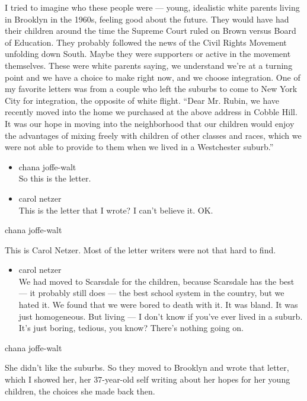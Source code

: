I tried to imagine who these people were --- young, idealistic white
parents living in Brooklyn in the 1960s, feeling good about the future.
They would have had their children around the time the Supreme Court
ruled on Brown versus Board of Education. They probably followed the
news of the Civil Rights Movement unfolding down South. Maybe they were
supporters or active in the movement themselves. These were white
parents saying, we understand we're at a turning point and we have a
choice to make right now, and we choose integration. One of my favorite
letters was from a couple who left the suburbs to come to New York City
for integration, the opposite of white flight. ``Dear Mr. Rubin, we have
recently moved into the home we purchased at the above address in Cobble
Hill. It was our hope in moving into the neighborhood that our children
would enjoy the advantages of mixing freely with children of other
classes and races, which we were not able to provide to them when we
lived in a Westchester suburb.''

\begin{itemize}
\item
  chana joffe-walt\\
  So this is the letter.
\item
  carol netzer\\
  This is the letter that I wrote? I can't believe it. OK.
\end{itemize}

chana joffe-walt

This is Carol Netzer. Most of the letter writers were not that hard to
find.

\begin{itemize}
\tightlist
\item
  carol netzer\\
  We had moved to Scarsdale for the children, because Scarsdale has the
  best --- it probably still does --- the best school system in the
  country, but we hated it. We found that we were bored to death with
  it. It was bland. It was just homogeneous. But living --- I don't know
  if you've ever lived in a suburb. It's just boring, tedious, you know?
  There's nothing going on.
\end{itemize}

chana joffe-walt

She didn't like the suburbs. So they moved to Brooklyn and wrote that
letter, which I showed her, her 37-year-old self writing about her hopes
for her young children, the choices she made back then.

